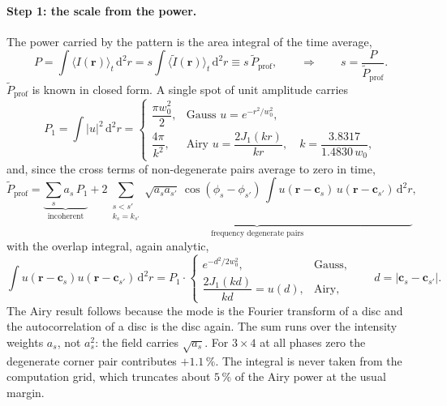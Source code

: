 \paragraph{Step 1: the scale from the power.}
The power carried by the pattern is the area integral of the time average,
\begin{equation}
P=\int\!\langle I(\mathbf r)\rangle_t\,\mathrm d^2r
 =s\int\!\langle\tilde I(\mathbf r)\rangle_t\,\mathrm d^2r
 \equiv s\,\tilde P_\mathrm{prof},
\qquad\Longrightarrow\qquad
s=\frac{P}{\tilde P_\mathrm{prof}} .
\end{equation}
$\tilde P_\mathrm{prof}$ is known in closed form. A single spot of unit
amplitude carries
\begin{equation}
P_1=\int\!|u|^2\,\mathrm d^2r=
\begin{cases}
\dfrac{\pi w_0^2}{2}, & \text{Gauss } u=e^{-r^2/w_0^2},\\[2ex]
\dfrac{4\pi}{k^2}, & \text{Airy } u=\dfrac{2J_1(kr)}{kr},\quad
k=\dfrac{3.8317}{1.4830\,w_0},
\end{cases}
\end{equation}
and, since the cross terms of non-degenerate pairs average to zero in time,
\begin{equation}
\tilde P_\mathrm{prof}
=\underbrace{\sum_s a_s\,P_1}_{\text{incoherent}}
+\underbrace{2\!\!\sum_{\substack{s<s'\\ k_s=k_{s'}}}\!\!\sqrt{a_sa_{s'}}
\,\cos(\phi_s-\phi_{s'})\,
\int\! u(\mathbf r-\mathbf c_s)\,u(\mathbf r-\mathbf c_{s'})\,\mathrm d^2r}
_{\text{frequency degenerate pairs}} ,
\end{equation}
with the overlap integral, again analytic,
\begin{equation}
\int\! u(\mathbf r-\mathbf c_s)u(\mathbf r-\mathbf c_{s'})\,\mathrm d^2r
=P_1\cdot
\begin{cases}
e^{-d^2/2w_0^2}, & \text{Gauss},\\[1ex]
\dfrac{2J_1(kd)}{kd}=u(d), & \text{Airy},
\end{cases}
\qquad d=|\mathbf c_s-\mathbf c_{s'}| .
\end{equation}
The Airy result follows because the mode is the Fourier transform of a disc and
the autocorrelation of a disc is the disc again. The sum runs over the
intensity weights $a_s$, not $a_s^2$: the field carries $\sqrt{a_s}$. For
$3\times4$ at all phases zero the degenerate corner pair contributes $+1.1\,\%$.
The integral is never taken from the computation grid, which truncates about
$5\,\%$ of the Airy power at the usual margin.

